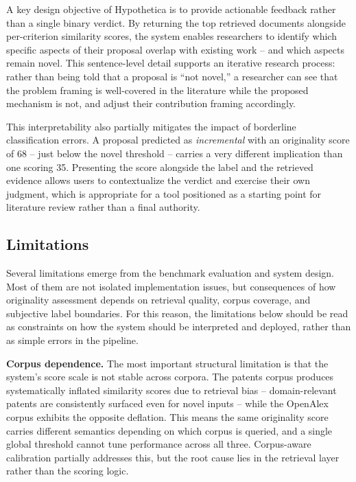 A key design objective of Hypothetica is to provide actionable feedback rather than a single binary verdict. By returning the top retrieved documents alongside per-criterion similarity scores, the system enables researchers to identify which specific aspects of their proposal overlap with existing work -- and which aspects remain novel. This sentence-level detail supports an iterative research process: rather than being told that a proposal is ``not novel,'' a researcher can see that the problem framing is well-covered in the literature while the proposed mechanism is not, and adjust their contribution framing accordingly.

This interpretability also partially mitigates the impact of borderline classification errors. A proposal predicted as \textit{incremental} with an originality score of 68 -- just below the novel threshold -- carries a very different implication than one scoring 35. Presenting the score alongside the label and the retrieved evidence allows users to contextualize the verdict and exercise their own judgment, which is appropriate for a tool positioned as a starting point for literature review rather than a final authority.

\subsection{Limitations}

Several limitations emerge from the benchmark evaluation and system design. Most of them are not isolated implementation issues, but consequences of how originality assessment depends on retrieval quality, corpus coverage, and subjective label boundaries. For this reason, the limitations below should be read as constraints on how the system should be interpreted and deployed, rather than as simple errors in the pipeline.

\textbf{Corpus dependence.} The most important structural limitation is that the system's score scale is not stable across corpora. The patents corpus produces systematically inflated similarity scores due to retrieval bias -- domain-relevant patents are consistently surfaced even for novel inputs -- while the OpenAlex corpus exhibits the opposite deflation. This means the same originality score carries different semantics depending on which corpus is queried, and a single global threshold cannot tune performance across all three. Corpus-aware calibration partially addresses this, but the root cause lies in the retrieval layer rather than the scoring logic.

